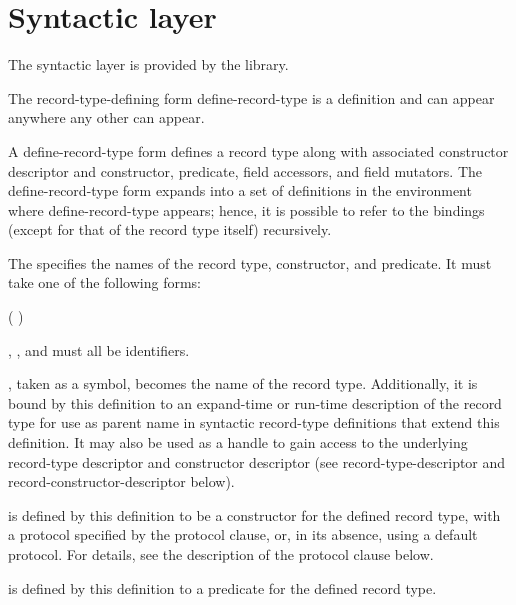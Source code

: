 \section{Syntactic layer}
\label{recordssyntacticsection}

The syntactic layer is provided by the  library.

The record-type-defining form {\cf define-record-type} is a definition and
can appear anywhere any other  can appear.

\begin{entry}{%
}

A {\cf define-record-type} form defines a record type along with
associated constructor descriptor and constructor, predicate, field
accessors, and field mutators. The {\cf define-record-type} form expands into
a set of definitions in the environment where {\cf define-record-type}
appears; hence, it is possible to refer to the bindings (except for
that of the record type itself) recursively.

The  specifies the names of the record type,
constructor, and predicate. It must take one of the following
forms:

\begin{scheme}
(  )
\end{scheme}

, , and  must all be identifiers.

, taken as a symbol, becomes the name of the record
type.  Additionally, it is bound by this definition to an expand-time
or run-time description of the record type for use as parent name in
syntactic record-type definitions that extend this definition. It may
also be used as a handle to gain access to the underlying record-type
descriptor and constructor descriptor (see {\cf
  record-type-descriptor} and {\cf record-constructor-descriptor}
below).

 is defined by this definition to be a
constructor for the defined record type, with a protocol specified by
the {\cf protocol} clause, or, in its absence, using a default protocol. For
details, see the description of the {\cf protocol} clause below.

 is defined by this definition to a predicate
for the defined record type.


\end{entry}
